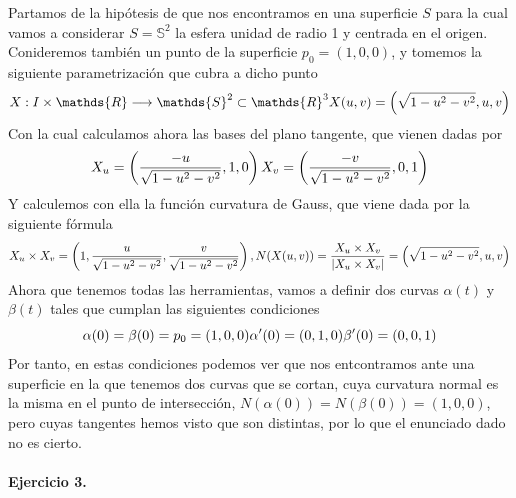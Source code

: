 \documentclass[fleqn]{article}
\def\R{\mathds{R}}
\begin{document}
    Partamos de la hipótesis de que nos encontramos en una superficie $S$ para la cual vamos a considerar $S=\mathds{S}^2$ la esfera unidad de radio 1 y centrada en el origen. 
    Conideremos también un punto de la superficie $p_0 = (1,0,0)$, y tomemos la siguiente parametrización que cubra a dicho punto
    \begin{equation*}
        X: I\times \R \longrightarrow \mathds{S}^2 \subset \R^3 \\
        X(u,v) = \left(\sqrt{1-u^2-v^2}, u, v\right)
    \end{equation*} 
    Con la cual calculamos ahora las bases del plano tangente, que vienen dadas por
    \begin{equation*}
        X_u = \left(\frac{-u}{\sqrt{1-u^2-v^2}}, 1, 0\right) \\
        X_v = \left(\frac{-v}{\sqrt{1-u^2-v^2}}, 0, 1\right)    
    \end{equation*}
    Y calculemos con ella la función curvatura de Gauss, que viene dada por la siguiente fórmula
    \begin{equation*}
        X_u \times X_v = \left(1, \frac{u}{\sqrt{1-u^2-v^2}}, \frac{v}{\sqrt{1-u^2-v^2}}\right), \quad\\
        N(X(u,v)) = \frac{X_u \times X_v}{|X_u \times X_v|} = \left(\sqrt{1-u^2-v^2}, u, v\right)
    \end{equation*}
    Ahora que tenemos todas las herramientas, vamos a definir dos curvas $\alpha(t)$ y $\beta(t)$ tales que cumplan las siguientes condiciones
    \begin{equation*}
        \alpha(0) = \beta(0) = p_0 = (1,0,0) \\
        \alpha'(0) = (0,1,0) \\
        \beta' (0) = (0,0,1)
    \end{equation*}
    Por tanto, en estas condiciones podemos ver que nos entcontramos ante una superficie en la que tenemos dos curvas que se cortan, cuya curvatura normal es la misma en el 
    punto de intersección, $N(\alpha(0)) = N(\beta(0)) = (1,0,0)$, pero cuyas tangentes hemos visto que son distintas, por lo que el enunciado dado no es cierto.\\ \\

    \textbf{Ejercicio 3. } \\
\end{document}
